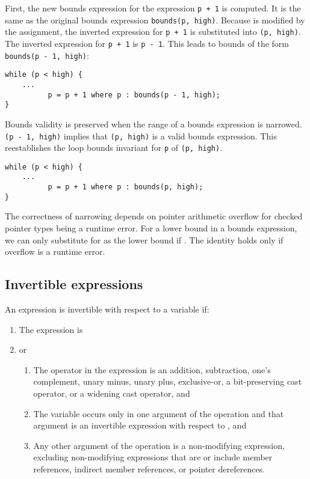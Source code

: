 First, the new bounds expression for the expression \lstinline|p + 1| is
computed. It is the same as the original bounds expression
\lstinline|bounds(p, high)|. Because  is modified by the assignment, the
inverted expression for \lstinline|p + 1| is substituted into
\lstinline|(p, high)|. The inverted expression for \lstinline|p + 1| is \lstinline|p - 1|.
This leads to bounds of the form \lstinline|bounds(p - 1, high)|:

\begin{lstlisting}
while (p < high) {
    ...
          p = p + 1 where p : bounds(p - 1, high);
}
\end{lstlisting}

Bounds validity is preserved when the range of a bounds expression is
narrowed. \lstinline|(p - 1, high)| implies that \lstinline|(p, high)| is a
valid bounds expression. This reestablishes the loop bounds invariant
for \lstinline|p| of \lstinline|(p, high)|.

\begin{lstlisting}
while (p < high) {
    ...
          p = p + 1 where p : bounds(p, high);
}
\end{lstlisting}

The correctness of narrowing depends on pointer arithmetic overflow
for checked pointer types being a runtime error. For a lower bound  in a bounds
expression, we can only substitute  for  as the lower
bound if  \code{>=} . The identity  
holds only if overflow is a runtime error.

\subsection{Invertible expressions}
An expression is invertible with respect to a variable  if:

\begin{enumerate}
\item
  The expression is 
\item
  or

  \begin{enumerate}
  \item
    The operator in the expression is an addition, subtraction, one's
    complement, unary minus, unary plus, exclusive-or, a bit-preserving
    cast operator, or a widening cast operator, and
  \item
    The variable  occurs only in one argument of the operation and that
    argument is an invertible expression with respect to , and
  \item

    Any other argument of the operation is a non-modifying expression,
    excluding non-modifying expressions that are or include member
    references, indirect member references, or pointer dereferences.
  \end{enumerate}
\end{enumerate}

